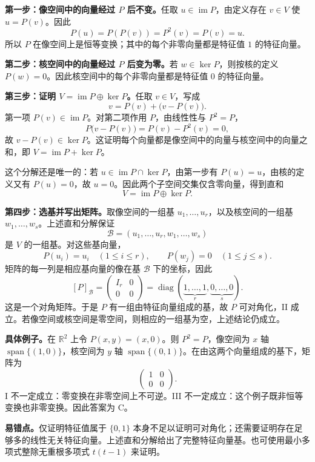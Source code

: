 \documentclass[11pt,a4paper,fontset=fandol]{ctexart}
\begin{document}
\textbf{第一步：像空间中的向量经过 \(P\) 后不变。}任取 \(u\in\operatorname{im}P\)，由定义存在 \(v\in V\) 使 \(u=P(v)\)。因此
\[
P(u)=P(P(v))=P^2(v)=P(v)=u.
\]
所以 \(P\) 在像空间上是恒等变换；其中的每个非零向量都是特征值 \(1\) 的特征向量。

\textbf{第二步：核空间中的向量经过 \(P\) 后变为零。}若 \(w\in\ker P\)，则按核的定义 \(P(w)=0\)。因此核空间中的每个非零向量都是特征值 \(0\) 的特征向量。

\textbf{第三步：证明 \(V=\operatorname{im}P\oplus\ker P\)。}任取 \(v\in V\)，写成
\[
v=P(v)+\bigl(v-P(v)\bigr).
\]
第一项 \(P(v)\in\operatorname{im}P\)。对第二项作用 \(P\)，由线性性与 \(P^2=P\)，
\[
P\bigl(v-P(v)\bigr)=P(v)-P^2(v)=0,
\]
故 \(v-P(v)\in\ker P\)。这证明每个向量都是像空间中的向量与核空间中的向量之和，即 \(V=\operatorname{im}P+\ker P\)。

这个分解还是唯一的：若 \(u\in\operatorname{im}P\cap\ker P\)，由第一步有 \(P(u)=u\)，由核的定义又有 \(P(u)=0\)，故 \(u=0\)。因此两个子空间交集仅含零向量，得到直和
\[
V=\operatorname{im}P\oplus\ker P.
\]

\textbf{第四步：选基并写出矩阵。}取像空间的一组基 \(u_1,\ldots,u_r\)，以及核空间的一组基 \(w_1,\ldots,w_s\)。上述直和分解保证
\[
\mathcal B=(u_1,\ldots,u_r,w_1,\ldots,w_s)
\]
是 \(V\) 的一组基。对这些基向量，
\[
P(u_i)=u_i\quad(1\le i\le r),\qquad P(w_j)=0\quad(1\le j\le s).
\]
矩阵的每一列是相应基向量的像在基 \(\mathcal B\) 下的坐标，因此
\[
[P]_{\mathcal B}=
\begin{pmatrix}I_r&0\\0&0\end{pmatrix}
=\operatorname{diag}(\underbrace{1,\ldots,1}_{r},
\underbrace{0,\ldots,0}_{s}).
\]
这是一个对角矩阵。于是 \(P\) 有一组由特征向量组成的基，故 \(P\) 可对角化，II 成立。若像空间或核空间是零空间，则相应的一组基为空，上述结论仍成立。

\textbf{具体例子。}在 \(\mathbb R^2\) 上令 \(P(x,y)=(x,0)\)。则 \(P^2=P\)，像空间为 \(x\) 轴 \(\operatorname{span}\{(1,0)\}\)，核空间为 \(y\) 轴 \(\operatorname{span}\{(0,1)\}\)。在由这两个向量组成的基下，矩阵为
\[
\begin{pmatrix}1&0\\0&0\end{pmatrix}.
\]
I 不一定成立：零变换在非零空间上不可逆。III 不一定成立：这个例子既非恒等变换也非零变换。因此答案为 C。

\textbf{易错点。}仅证明特征值属于 \(\{0,1\}\) 本身不足以证明可对角化；还需要证明存在足够多的线性无关特征向量。上述直和分解给出了完整特征向量基。也可使用最小多项式整除无重根多项式 \(t(t-1)\) 来证明。
\end{document}
